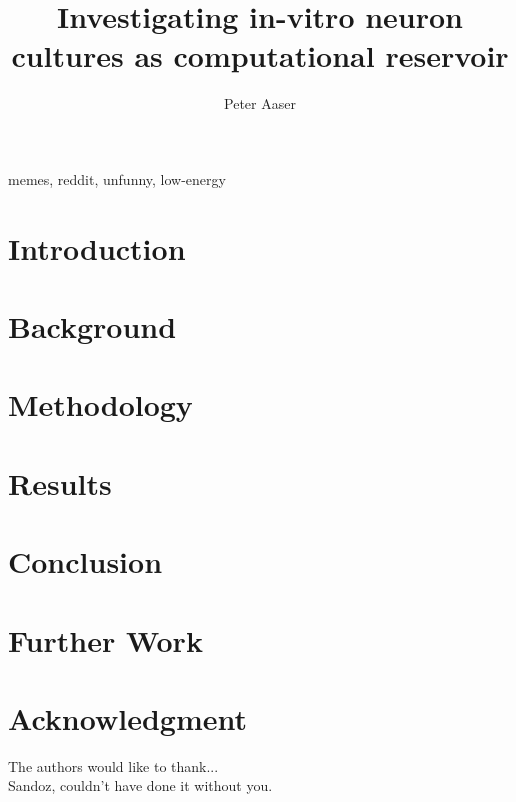 \documentclass[journal]{IEEEtran}
\begin{document}
\title{Investigating in-vitro neuron cultures as computational reservoir}

\author{Peter Aaser}
%
\maketitle

\begin{abstract}
  \blindtext[2]

\end{abstract}

\begin{IEEEkeywords}
memes, reddit, unfunny, low-energy
\end{IEEEkeywords}

\section{Introduction}

\section{Background}

\section{Methodology}

\section{Results}

\section{Conclusion}

\section{Further Work}



\section*{Acknowledgment}
The authors would like to thank...\\
Sandoz, couldn't have done it without you.


 

\end{document}
